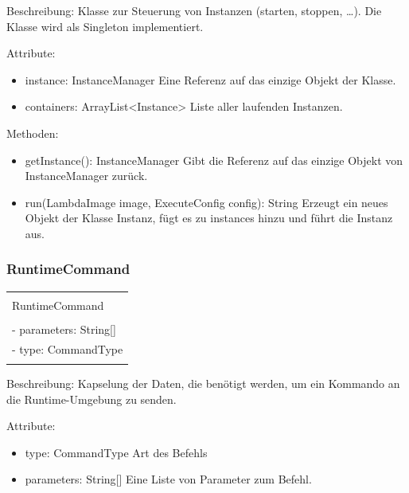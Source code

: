 \documentclass[a4paper,20pt,oneside]{book}
\begin{document}
	\raggedright
	\vspace{0.5cm}
	
	Beschreibung:
	\linebreak
	Klasse zur Steuerung von Instanzen (starten, stoppen, \dots). Die Klasse wird als Singleton implementiert.
	\vspace{0.5cm}	
	
	Attribute:
	\begin{itemize}
	\item instance: InstanceManager
	\linebreak Eine Referenz auf das einzige Objekt der Klasse.
	\item containers: ArrayList<Instance>
	\linebreak Liste aller laufenden Instanzen.
	\end{itemize}
	
	Methoden:
	\begin{itemize}
	\item getInstance(): InstanceManager
	\linebreak Gibt die Referenz auf das einzige Objekt von InstanceManager zurück.
	\item run(LambdaImage image, ExecuteConfig config): String
	\linebreak Erzeugt ein neues Objekt der Klasse Instanz, fügt es zu instances hinzu und führt die Instanz aus.
	\end{itemize}
	
	\subsubsection{RuntimeCommand}
	\centering
	\begin{tabular}{|l|}
	\hline \\
	RuntimeCommand \\
	\hline \\
	- parameters: String[] \\
	- type: CommandType \\
	\hline \\
	\hline 
	\end{tabular}	
	
	\raggedright
	\vspace{0.5cm}
	
	Beschreibung:
	\linebreak Kapselung der Daten, die benötigt werden, um ein Kommando an die Runtime-Umgebung zu senden.
	\vspace{0.5cm}	
	
	Attribute:
	\begin{itemize}
	\item type: CommandType
	\linebreak Art des Befehls
	\item parameters: String[]
	\linebreak Eine Liste von Parameter zum Befehl.
	\end{itemize}		
	
\end{document}
